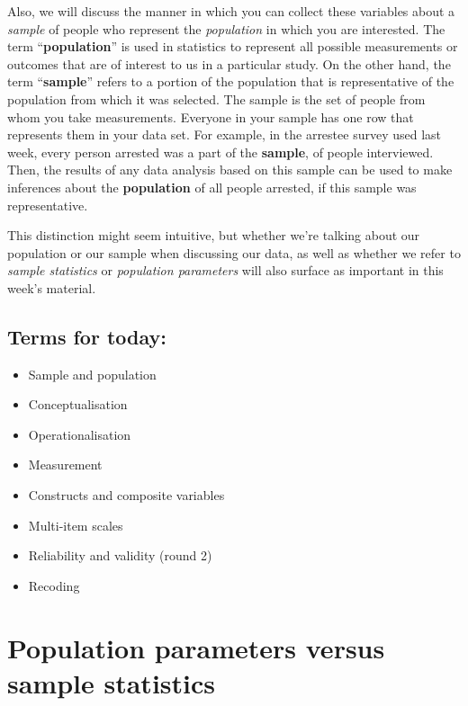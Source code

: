 \documentclass[
]{book}
\providecommand{\tightlist}{%
  \setlength{\itemsep}{0pt}\setlength{\parskip}{0pt}}
\begin{document}
Also, we will discuss the manner in which you can collect these variables about a \emph{sample} of people who represent the \emph{population} in which you are interested. The term ``\textbf{population}'' is used in statistics to represent all possible measurements or outcomes that are of interest to us in a particular study. On the other hand, the term ``\textbf{sample}'' refers to a portion of the population that is representative of the population from which it was selected. The sample is the set of people from whom you take measurements. Everyone in your sample has one row that represents them in your data set. For example, in the arrestee survey used last week, every person arrested was a part of the \textbf{sample}, of people interviewed. Then, the results of any data analysis based on this sample can be used to make inferences about the \textbf{population} of all people arrested, if this sample was representative.

This distinction might seem intuitive, but whether we're talking about our population or our sample when discussing our data, as well as whether we refer to \emph{sample statistics} or \emph{population parameters} will also surface as important in this week's material.

\hypertarget{terms-for-today-2}{%
\subsection{Terms for today:}\label{terms-for-today-2}}

\begin{itemize}
\tightlist
\item
  Sample and population
\item
  Conceptualisation
\item
  Operationalisation
\item
  Measurement
\item
  Constructs and composite variables
\item
  Multi-item scales
\item
  Reliability and validity (round 2)
\item
  Recoding
\end{itemize}

\hypertarget{population-parameters-versus-sample-statistics}{%
\section{Population parameters versus sample statistics}\label{population-parameters-versus-sample-statistics}}
\end{document}
